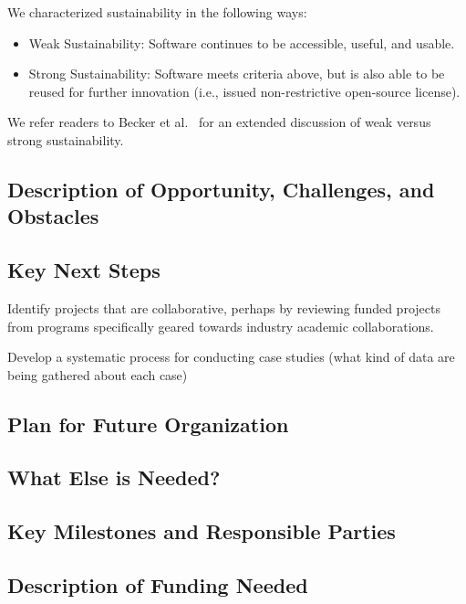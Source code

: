 We characterized sustainability in the following ways:
\begin{itemize}

\item Weak Sustainability: Software continues to be accessible, useful, and
usable.

\item Strong Sustainability: Software meets criteria above, but is also able to
be reused for further innovation (i.e., issued non-restrictive open-source
license).

\end{itemize}
We refer readers to Becker et al.~\cite{Becker:2014} for an extended discussion of weak versus strong
sustainability. 


\subsection{Description of Opportunity, Challenges, and Obstacles}


\subsection{Key Next Steps}

Identify projects that are collaborative, perhaps by reviewing funded projects from programs specifically geared towards industry academic collaborations.



Develop a systematic process for conducting case studies (what kind of data are being gathered about each case)



\subsection{Plan for Future Organization}


\subsection{What Else is Needed?}


\subsection{Key Milestones and Responsible Parties}


\subsection{Description of Funding Needed}